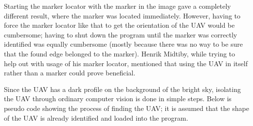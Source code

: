 Starting the marker locator with the marker in the image gave a completely different result, where the marker was located immediately. However, having to force the marker locator like that to get the orientation of the UAV would be cumbersome; having to shut down the program until the marker was correctly identified was equally cumbersome (mostly because there was no way to be sure that the found edge belonged to the marker). Henrik Midtiby, while trying to help out with usage of his marker locator, mentioned that using the UAV in itself rather than a marker could prove beneficial.

Since the UAV has a dark profile on the background of the bright sky, isolating the UAV through ordinary computer vision is done in simple steps. Below is pseudo code showing the process of finding the UAV; it is assumed that the shape of the UAV is already identified and loaded into the program.


